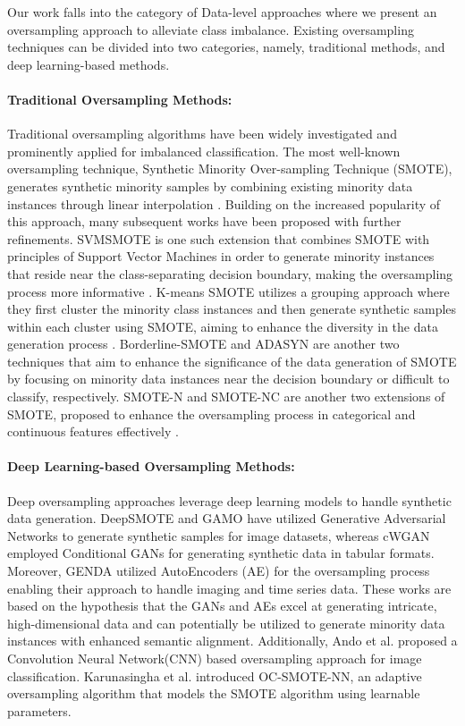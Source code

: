 Our work falls into the category of Data-level approaches where we present an oversampling approach to alleviate class imbalance. Existing oversampling techniques can be divided into two categories, namely, traditional methods, and deep learning-based methods.

\paragraph{\textbf{Traditional Oversampling Methods: }} Traditional oversampling algorithms have been widely investigated and prominently applied for imbalanced classification. The most well-known oversampling technique, Synthetic Minority Over-sampling Technique (SMOTE), generates synthetic minority samples by combining existing minority data instances through linear interpolation \cite{chawla2002smote}. Building on the increased popularity of this approach, many subsequent works have been proposed with further refinements. SVMSMOTE is one such extension that combines SMOTE with principles of Support Vector Machines in order to generate minority instances that reside near the class-separating decision boundary, making the oversampling process more informative \cite{tang2008svms}. K-means SMOTE utilizes a grouping approach where they first cluster the minority class instances and then generate synthetic samples within each cluster using SMOTE, aiming to enhance the diversity in the data generation process \cite{last2017kmeanssmote}. Borderline-SMOTE \cite{han2005borderline} and ADASYN \cite{he2008adasyn} are another two techniques that aim to enhance the significance of the data generation of SMOTE by focusing on minority data instances near the decision boundary or difficult to classify, respectively. SMOTE-N and SMOTE-NC are another two extensions of SMOTE, proposed to enhance the oversampling process in categorical and continuous features effectively \cite{chawla2002smote}.

\paragraph{\textbf{Deep Learning-based Oversampling Methods: }} Deep oversampling approaches leverage deep learning models to handle synthetic data generation. DeepSMOTE \cite{dablain2022deepsmote} and GAMO \cite{mullick2019generative} have utilized Generative Adversarial Networks to generate synthetic samples for image datasets, whereas cWGAN \cite{engelmann2021conditional} employed Conditional GANs for generating synthetic data in tabular formats. Moreover, GENDA \cite{troullinou2023generative} utilized AutoEncoders (AE) for the oversampling process enabling their approach to handle imaging and time series data. These works are based on the hypothesis that the GANs and AEs excel at generating intricate, high-dimensional data and can potentially be utilized to generate minority data instances with enhanced semantic alignment. Additionally,  Ando et al. \cite{ando2017deep} proposed a Convolution Neural Network(CNN) based oversampling approach for image classification. Karunasingha et al. \cite{karunasingha2023oc} introduced OC-SMOTE-NN, an adaptive oversampling algorithm that models the SMOTE  algorithm using learnable parameters.

